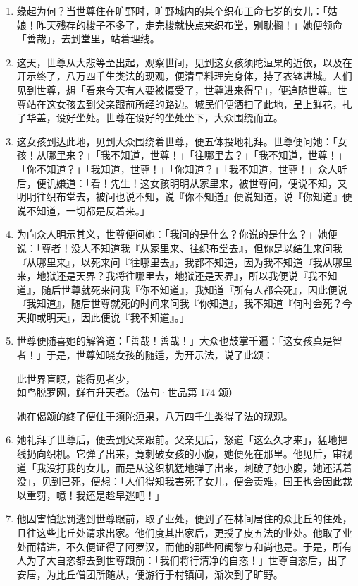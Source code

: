 \begin{enumerate}\item 缘起为何？当世尊住在旷野时，旷野城内的某个织布工命七岁的女儿：「姑娘！昨天残存的梭子不多了，走完梭就快点来织布堂，别耽搁！」她便领命「善哉」，去到堂里，站着理线。
\item 这天，世尊从大悲等至出起，观察世间，见到这女孩须陀洹果的近依，以及在开示终了，八万四千生类法的现观，便清早料理完身体，持了衣钵进城。人们见到世尊，想「看来今天有人要被摄受了，世尊进来得早」，便追随世尊。世尊站在这女孩去到父亲跟前所经的路边。城民们便洒扫了此地，呈上鲜花，扎了华盖，设好坐处。世尊在设好的坐处坐下，大众围绕而立。
\item 这女孩到达此地，见到大众围绕着世尊，便五体投地礼拜。世尊便问她：「女孩！从哪里来？」「我不知道，世尊！」「往哪里去？」「我不知道，世尊！」「你不知道？」「我知道，世尊！」「你知道？」「我不知道，世尊！」众人听后，便讥嫌道：「看！先生！这女孩明明从家里来，被世尊问，便说不知，又明明往织布堂去，被问也说不知，说『你不知道』便说知道，说『你知道』便说不知道，一切都是反着来。」
\item 为向众人明示其义，世尊便问她：「我问的是什么？你说的是什么？」她便说：「尊者！没人不知道我『从家里来、往织布堂去』，但你是以结生来问我『从哪里来』，以死来问『往哪里去』，我都不知道，因为我不知道『我从哪里来，地狱还是天界？我将往哪里去，地狱还是天界』，所以我便说『我不知道』，随后世尊就死来问我『你不知道』，我知道『所有人都会死』，因此便说『我知道』，随后世尊就死的时间来问我『你知道』，我不知道『何时会死？今天抑或明天』，因此便说『我不知道』。」
\item 世尊便随喜她的解答道：「善哉！善哉！」大众也鼓掌千遍：「这女孩真是智者！」于是，世尊知晓女孩的随适，为开示法，说了此颂：\begin{quoting}此世界盲暝，能得见者少，\\如鸟脱罗网，鲜有升天者。（法句·世品第 174 颂）\end{quoting}她在偈颂的终了便住于须陀洹果，八万四千生类得了法的现观。
\item 她礼拜了世尊后，便去到父亲跟前。父亲见后，怒道「这么久才来」，猛地把线扔向织机。它弹了出来，竟刺破女孩的小腹，她便死在那里。他见后，审视道「我没打我的女儿，而是从这织机猛地弹了出来，刺破了她小腹，她还活着没」，见到已死，便想：「人们得知我害死了女儿，便会责难，国王也会因此裁以重罚，噫！我还是趁早逃吧！」
\item 他因害怕惩罚逃到世尊跟前，取了业处，便到了在林间居住的众比丘的住处，且往这些比丘处请求出家。他们度其出家后，更授了皮五法的业处。他取了业处而精进，不久便证得了阿罗汉，而他的那些阿阇黎与和尚也是。于是，所有人为了大自恣都去到世尊跟前：「我们将行清净的自恣！」世尊自恣后，出了安居，为比丘僧团所随从，便游行于村镇间，渐次到了旷野。

\end{enumerate}
